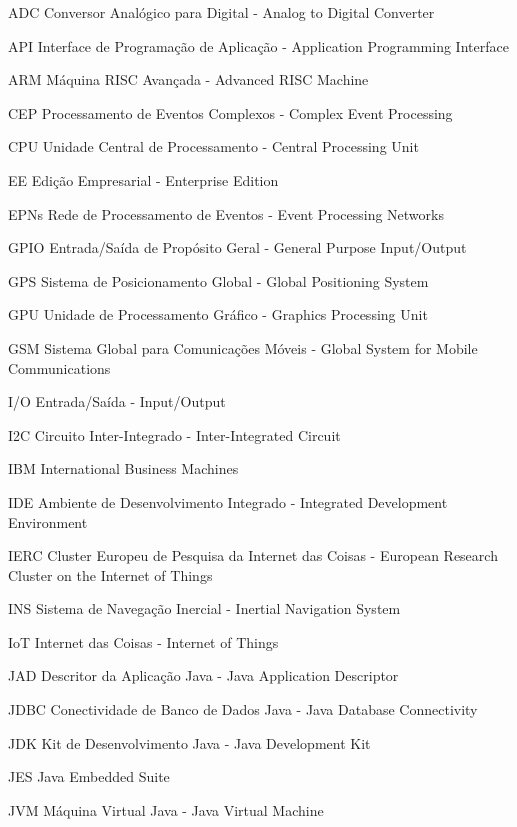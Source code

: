 \begin{siglas}
    \item[ADC] Conversor Analógico para Digital - Analog to Digital Converter
    \item[API] Interface de Programação de Aplicação - Application Programming
    Interface
    \item[ARM] Máquina RISC Avançada - Advanced RISC Machine
    \item[CEP] Processamento de Eventos Complexos - Complex Event Processing
    \item[CPU] Unidade Central de Processamento - Central Processing Unit
    \item[EE] Edição Empresarial - Enterprise Edition
    \item[EPNs] Rede de Processamento de Eventos - Event Processing Networks
    \item[GPIO] Entrada/Saída de Propósito Geral - General Purpose Input/Output
    \item[GPS] Sistema de Posicionamento Global - Global Positioning System
    \item[GPU] Unidade de Processamento Gráfico - Graphics Processing Unit
    \item[GSM] Sistema Global para Comunicações Móveis - Global System for
    Mobile Communications
    \item[I/O] Entrada/Saída - Input/Output
    \item[I2C] Circuito Inter-Integrado - Inter-Integrated Circuit
    \item[IBM] International Business Machines
    \item[IDE] Ambiente de Desenvolvimento Integrado - Integrated Development
    Environment
    \item[IERC] Cluster Europeu de Pesquisa da Internet das Coisas - European
    Research Cluster on the Internet of Things
    \item[INS] Sistema de Navegação Inercial - Inertial Navigation System
    \item[IoT] Internet das Coisas - Internet of Things
    \item[JAD] Descritor da Aplicação Java - Java Application Descriptor
    \item[JDBC] Conectividade de Banco de Dados Java - Java Database
    Connectivity
    \item[JDK] Kit de Desenvolvimento Java - Java Development Kit
    \item[JES] Java Embedded Suite
    \item[JVM] Máquina Virtual Java - Java Virtual Machine

\end{siglas}
